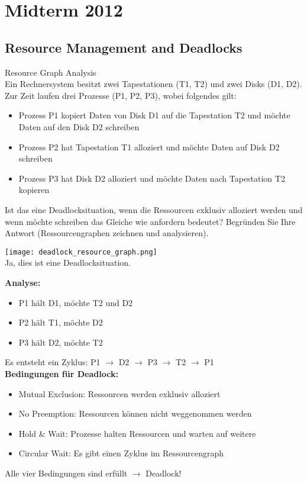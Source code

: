 \section{Midterm 2012} 

\subsection{Resource Management and Deadlocks}

\begin{example2}{Resource Graph Analysis}\\
    Ein Rechnersystem besitzt zwei Tapestationen (T1, T2) und zwei Disks (D1, D2). Zur Zeit laufen drei Prozesse (P1, P2, P3), wobei folgendes gilt:
    \begin{itemize}
        \item Prozess P1 kopiert Daten von Disk D1 auf die Tapestation T2 und möchte Daten auf den Disk D2 schreiben
        \item Prozess P2 hat Tapestation T1 alloziert und möchte Daten auf Disk D2 schreiben
        \item Prozess P3 hat Disk D2 alloziert und möchte Daten nach Tapestation T2 kopieren
    \end{itemize}
    
    Ist das eine Deadlocksituation, wenn die Ressourcen exklusiv alloziert werden und wenn möchte schreiben das Gleiche wie anfordern bedeutet? Begründen Sie Ihre Antwort (Ressourcengraphen zeichnen und analysieren).
    
    \tcblower
    \texttt{[image: deadlock\_resource\_graph.png]}\\
    Ja, dies ist eine Deadlocksituation. 
    
    \textbf{Analyse:}
    \begin{itemize}
        \item P1 hält D1, möchte T2 und D2
        \item P2 hält T1, möchte D2  
        \item P3 hält D2, möchte T2
    \end{itemize}
    
    Es entsteht ein Zyklus: P1 $\rightarrow$ D2 $\rightarrow$ P3 $\rightarrow$ T2 $\rightarrow$ P1\\
    
    \textbf{Bedingungen für Deadlock:}
    \begin{itemize}
        \item Mutual Exclusion: Ressourcen werden exklusiv alloziert
        \item No Preemption: Ressourcen können nicht weggenommen werden
        \item Hold \& Wait: Prozesse halten Ressourcen und warten auf weitere
        \item Circular Wait: Es gibt einen Zyklus im Ressourcengraph
    \end{itemize}
    
    Alle vier Bedingungen sind erfüllt $\rightarrow$ Deadlock!
\end{example2}

